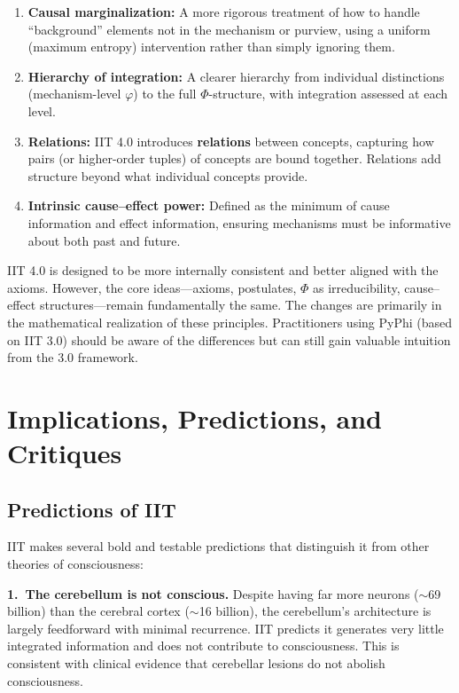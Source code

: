 \documentclass[11pt,a4paper]{report}
\newcommand{\Phi}{\varPhi}
\begin{document}
\begin{enumerate}[leftmargin=2em]
  \item \textbf{Causal marginalization:} A more rigorous treatment of how to handle ``background'' elements not in the mechanism or purview, using a uniform (maximum entropy) intervention rather than simply ignoring them.
  \item \textbf{Hierarchy of integration:} A clearer hierarchy from individual distinctions (mechanism-level $\varphi$) to the full $\Phi$-structure, with integration assessed at each level.
  \item \textbf{Relations:} IIT 4.0 introduces \textbf{relations} between concepts, capturing how pairs (or higher-order tuples) of concepts are bound together. Relations add structure beyond what individual concepts provide.
  \item \textbf{Intrinsic cause--effect power:} Defined as the minimum of cause information and effect information, ensuring mechanisms must be informative about both past and future.
\end{enumerate}

\begin{notebox}
IIT 4.0 is designed to be more internally consistent and better aligned with the axioms. However, the core ideas---axioms, postulates, $\Phi$ as irreducibility, cause--effect structures---remain fundamentally the same. The changes are primarily in the mathematical realization of these principles. Practitioners using PyPhi (based on IIT 3.0) should be aware of the differences but can still gain valuable intuition from the 3.0 framework.
\end{notebox}


\chapter{Implications, Predictions, and Critiques}

\section{Predictions of IIT}

IIT makes several bold and testable predictions that distinguish it from other theories of consciousness:

\textbf{1.\ The cerebellum is not conscious.} Despite having far more neurons ($\sim$69 billion) than the cerebral cortex ($\sim$16 billion), the cerebellum's architecture is largely feedforward with minimal recurrence. IIT predicts it generates very little integrated information and does not contribute to consciousness. This is consistent with clinical evidence that cerebellar lesions do not abolish consciousness.
\end{document}
